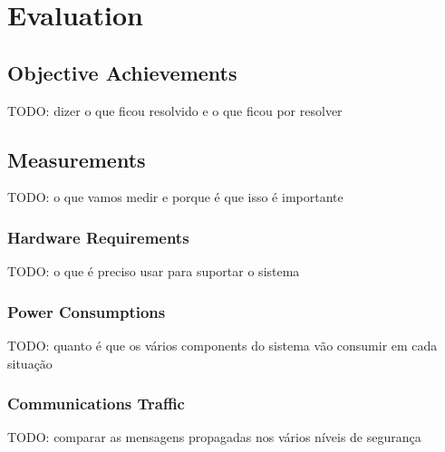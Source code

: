 
\chapter{Evaluation}
\label{chapter:evaluation}
\section{Objective Achievements}
TODO: dizer o que ficou resolvido e o que ficou por resolver
\section{Measurements}
TODO: o que vamos medir e porque é que isso é importante
\subsection{Hardware Requirements}
TODO: o que é preciso usar para suportar o sistema
\subsection{Power Consumptions}
TODO: quanto é que os vários components do sistema vão consumir em cada situação
\subsection{Communications Traffic}
TODO: comparar as mensagens propagadas nos vários níveis de segurança
